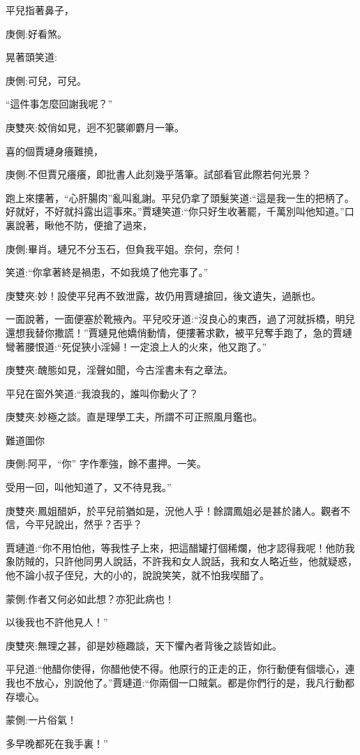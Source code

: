 \begin{parag}
    平兒指著鼻子，\begin{note}庚側:好看煞。\end{note}晃著頭笑道:\begin{note}庚側:可兒，可兒。\end{note}“這件事怎麼回謝我呢？”\begin{note}庚雙夾:姣俏如見，迥不犯襲卿麝月一筆。\end{note}喜的個賈璉身癢難撓，\begin{note}庚側:不但賈兄癢癢，即批書人此刻幾乎落筆。試部看官此際若何光景？\end{note}跑上來摟著，“心肝腸肉”亂叫亂謝。平兒仍拿了頭髮笑道:“這是我一生的把柄了。好就好，不好就抖露出這事來。”賈璉笑道:“你只好生收著罷，千萬別叫他知道。”口裏說著，瞅他不防，便搶了過來，\begin{note}庚側:畢肖。璉兄不分玉石，但負我平姐。奈何，奈何！\end{note}笑道:“你拿著終是禍患，不如我燒了他完事了。”\begin{note}庚雙夾:妙！設使平兒再不致泄露，故仍用賈璉搶回，後文遺失，過脈也。\end{note}一面說著，一面便塞於靴掖內。平兒咬牙道:“沒良心的東西，過了河就拆橋，明兒還想我替你撒謊！”賈璉見他嬌俏動情，便摟著求歡，被平兒奪手跑了，急的賈璉彎著腰恨道:“死促狹小淫婦！一定浪上人的火來，他又跑了。”\begin{note}庚雙夾:醜態如見，淫聲如聞，今古淫書未有之章法。\end{note}平兒在窗外笑道:“我浪我的，誰叫你動火了？\begin{note}庚雙夾:妙極之談。直是理學工夫，所謂不可正照風月鑑也。\end{note}難道圖你\begin{note}庚側:阿平，“你” 字作牽強，餘不畫押。一笑。\end{note}受用一回，叫他知道了，又不待見我。”\begin{note}庚雙夾:鳳姐醋妒，於平兒前猶如是，況他人乎！餘謂鳳姐必是甚於諸人。觀者不信，今平兒說出，然乎？否乎？\end{note}賈璉道:“你不用怕他，等我性子上來，把這醋罐打個稀爛，他才認得我呢！他防我象防賊的，只許他同男人說話，不許我和女人說話，我和女人略近些，他就疑惑，他不論小叔子侄兒，大的小的，說說笑笑，就不怕我喫醋了。\begin{note}蒙側:作者又何必如此想？亦犯此病也！\end{note}以後我也不許他見人！”\begin{note}庚雙夾:無理之甚，卻是妙極趣談，天下懼內者背後之談皆如此。\end{note}平兒道:“他醋你使得，你醋他使不得。他原行的正走的正，你行動便有個壞心，連我也不放心，別說他了。”賈璉道:“你兩個一口賊氣。都是你們行的是，我凡行動都存壞心。\begin{note}蒙側:一片俗氣！\end{note}多早晚都死在我手裏！”
\end{parag}


